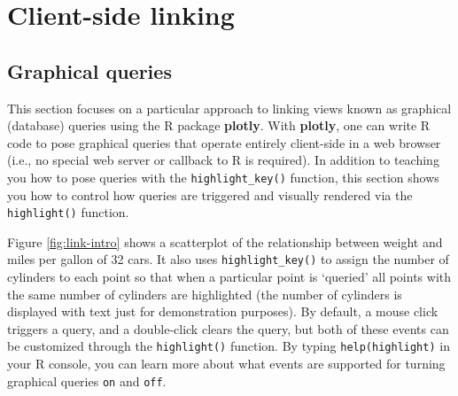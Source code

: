 \documentclass[
  12pt,
]{krantz}
\newenvironment{Shaded}{\begin{snugshade}}{\end{snugshade}}
\newcommand{\DataTypeTok}[1]{\textcolor[rgb]{0.13,0.29,0.53}{#1}}
\newcommand{\KeywordTok}[1]{\textcolor[rgb]{0.13,0.29,0.53}{\textbf{#1}}}
\newcommand{\NormalTok}[1]{#1}
\newcommand{\OperatorTok}[1]{\textcolor[rgb]{0.81,0.36,0.00}{\textbf{#1}}}
\newcommand{\StringTok}[1]{\textcolor[rgb]{0.31,0.60,0.02}{#1}}
\begin{document}
\hypertarget{client-side-linking}{%
\chapter{Client-side linking}\label{client-side-linking}}

\hypertarget{graphical-queries}{%
\section{Graphical queries}\label{graphical-queries}}

This section focuses on a particular approach to linking views known as graphical (database) queries using the R package \textbf{plotly}. With \textbf{plotly}, one can write R code to pose graphical queries that operate entirely client-side in a web browser (i.e., no special web server or callback to R is required). In addition to teaching you how to pose queries with the \texttt{highlight\_key()} function, this section shows you how to control how queries are triggered and visually rendered via the \texttt{highlight()} function.

Figure \ref{fig:link-intro} shows a scatterplot of the relationship between weight and miles per gallon of 32 cars. It also uses \texttt{highlight\_key()} to assign the number of cylinders to each point so that when a particular point is `queried' all points with the same number of cylinders are highlighted (the number of cylinders is displayed with text just for demonstration purposes). By default, a mouse click triggers a query, and a double-click clears the query, but both of these events can be customized through the \texttt{highlight()} function. By typing \texttt{help(highlight)} in your R console, you can learn more about what events are supported for turning graphical queries \texttt{on} and \texttt{off}.

\begin{Shaded}
\end{Shaded}
\end{document}
